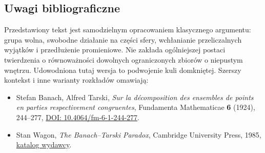 \subsection{Uwagi bibliograficzne}
Przedstawiony tekst jest samodzielnym opracowaniem klasycznego argumentu: grupa wolna, swobodne działanie na części sfery, wchłanianie przeliczalnych wyjątków i przedłużenie promieniowe. Nie zakłada ogólniejszej postaci twierdzenia o równoważności dowolnych ograniczonych zbiorów o niepustym wnętrzu. Udowodniona tutaj wersja to podwojenie kuli domkniętej. Szerszy kontekst i inne warianty rozkładów omawiają:
\begin{itemize}
\item Stefan Banach, Alfred Tarski, \emph{Sur la décomposition des ensembles de points en parties respectivement congruentes}, Fundamenta Mathematicae \textbf{6} (1924), 244--277, \href{https://doi.org/10.4064/fm-6-1-244-277}{DOI: 10.4064/fm-6-1-244-277}.
\item Stan Wagon, \emph{The Banach--Tarski Paradox}, Cambridge University Press, 1985, \href{https://www.cambridge.org/core/books/the-banach-tarski-paradox/EA35091E69D798AE0FAE5A4E8386DD08}{katalog wydawcy}.
\end{itemize}
